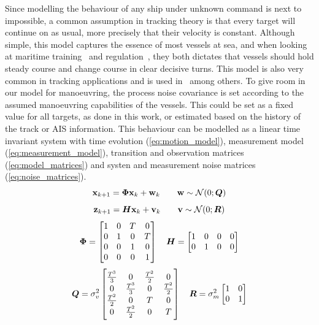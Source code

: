 Since modelling the behaviour of any ship under unknown command is next to impossible, a common assumption in tracking theory is that every target will continue on as usual, more precisely that their velocity is constant. Although simple, this model captures the essence of most vessels at sea, and when looking at maritime training~\cite{Allen2005} and regulation~\cite{IMO1972}, they both dictates that vessels should hold steady course and change course in clear decisive turns. This model is also very common in tracking applications and is used in~\cite{Reid1979,Coraluppi2000,Brekke2012,Wilthil,Vo2015,Chen2003,Habtemariam2015} among others. To give room in our model for manoeuvring, the process noise covariance is set according to the assumed manoeuvring capabilities of the vessels. This could be set as a fixed value for all targets, as done in this work, or estimated based on the history of the track or AIS information. This behaviour can be modelled as a linear time invariant system  with time evolution (\ref{eq:motion_model}), measurement model (\ref{eq:measurement_model}), transition and observation matrices (\ref{eq:model_matrices}) and systen and measurement noise matrices (\ref{eq:noise_matrices}).
\begin{equation}\label{eq:motion_model}
\boldsymbol{\mathbf{x}}_{k+1} = \bm{\Phi} \boldsymbol{\mathbf{x}}_k + \boldsymbol{\mathbf{w}}_k \qquad \boldsymbol{\mathbf{w}} \sim \mathcal{N}(0;\bm{Q})
\end{equation}
\begin{equation}\label{eq:measurement_model}
\boldsymbol{\mathbf{z}}_{k+1} = \bm{H}\boldsymbol{\mathbf{x}}_k + \boldsymbol{\mathbf{v}}_k \qquad \boldsymbol{\mathbf{v}} \sim \mathcal{N}(0;\bm{R})
\end{equation}
\begin{equation}\label{eq:model_matrices}
\bm{\Phi} =	\begin{bmatrix}
1 & 0 & T & 0 \\
0 & 1 & 0 & T \\
0 & 0 & 1 & 0 \\
0 & 0 & 0 & 1 \\
\end{bmatrix}
\quad
\bm{H} =	\begin{bmatrix}
1 & 0 & 0 & 0 \\
0 & 1 & 0 & 0 \\
\end{bmatrix}
\end{equation}
\begin{equation}\label{eq:noise_matrices}
\bm{Q}	= \sigma_v^2 \begin{bmatrix}
\frac{T^3}{3} 	& 0 				& \frac{T^2}{2}	& 0 			\\
0 				& \frac{T^3}{3}  	& 0 			& \frac{T^2}{2}	\\
\frac{T^2}{2}	& 0					& T				& 0				\\
0				& \frac{T^2}{2}		& 0				& T				\\
\end{bmatrix}
\quad
\bm{R} =	\sigma_m^2 
\begin{bmatrix}
1 & 0 \\
0 & 1 \\
\end{bmatrix}
\end{equation}
